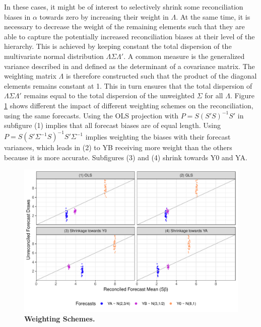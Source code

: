 \documentclass[a4paper,fleqn,11pt]{article}
\begin{document}
In these cases, it might be of interest to selectively shrink some reconciliation biases in $\alpha$ towards zero by increasing their weight in $\Lambda$. At the same time, it is necessary to decrease the weight of the remaining elements such that they are able to capture the potentially increased reconciliation biases at their level of the hierarchy. This is achieved by keeping constant the total dispersion of the  multivariate normal distribution $\Lambda\Sigma\Lambda'$. A common measure is the generalized variance described in \cite{Mustonen1997} and defined as the determinant of a covariance matrix. The weighting matrix $\Lambda$ is therefore constructed such that the product of the diagonal elements remains constant at 1. This in turn ensures that the total dispersion of $\Lambda\Sigma\Lambda'$ remains equal to the total dispersion of the unweighted $\Sigma$ for all $\Lambda$. Figure \ref{fig:weights} shows different the impact of different weighting schemes on the reconciliation, using the same forecasts. Using the OLS projection with $P = S(S'S)^{-1}S'$ in subfigure (1) implies that all forecast biases are of equal length. Using $P = S(S'\Sigma^{-1}S)^{-1}S'\Sigma^{-1}$ implies weighting the biases with their forecast variances, which leads in (2) to YB receiving more weight than the others because it is more accurate. Subfigures (3) and (4) shrink towards Y0 and YA.

\begin{figure}[H]
	\includegraphics[width=\textwidth]{fig/fig_biases}
	\caption[Weighting Schemes]{\textbf{Weighting Schemes.}}\label{fig:weights}
\end{figure}
\end{document}
